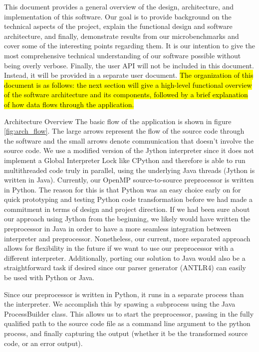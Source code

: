 \documentclass[letterpaper,12pt]{article} %
\makeatletter
\def\section{\@startsection{section}{1}%
  \z@{.7\linespacing\@plus\linespacing}{.5\linespacing}%
  {\normalfont\scshape}}%
\makeatother
\begin{document}
This document provides a general overview of the design, architecture, and implementation of this software. Our goal is to provide background on the technical aspects of the project, explain the functional design and software architecture, and finally, demonstrate results from our microbenchmarks and cover some of the interesting points regarding them. It is our intention to give the most comprehensive technical understanding of our software possible without being overly verbose. Finally, the user API will not be included in this document. Instead, it will be provided in a separate user document.  \hl{The organization of this document is as follows: the next section will give a high-level functional overview of the software architecture and its components, followed by a brief explanation of how data flows through the application. }

\section{Architecture Overview}
The basic flow of the application is shown in figure \ref{fig:arch_flow}. The large arrows represent the flow of the source code through the software and the small arrows denote communication that doesn't involve the source code. We use a modified version of the Jython interpreter since it does not implement a Global Interpreter Lock like CPython and therefore is able to run multithreaded code truly in parallel, using the underlying Java threads (Jython is written in Java). Currently, our OpenMP source-to-source preprocessor is written in Python. The reason for this is that Python was an easy choice early on for quick prototyping and testing Python code transformation before we had made a commitment in terms of design and project direction. If we had been sure about our approach using Jython from the beginning, we likely would have written the preprocessor in Java in order to have a more seamless integration between interpreter and preprocessor.  Nonetheless, our current, more separated approach allows for flexibility in the future if we want to use our preprocessor with a different interpreter. Additionally, porting our solution to Java would also be a straightforward task if desired since our parser generator (ANTLR4) can easily be used with Python or Java.

Since our preprocessor is written in Python, it runs in a separate process than the interpreter. We accomplish this by spawing a subprocess using the Java ProcessBuilder class. This allows us to start the preprocessor, passing in the fully qualified path to the source code file as a command line argument to the python process, and finally capturing the output (whether it be the transformed source code, or an error output). 
\end{document}
